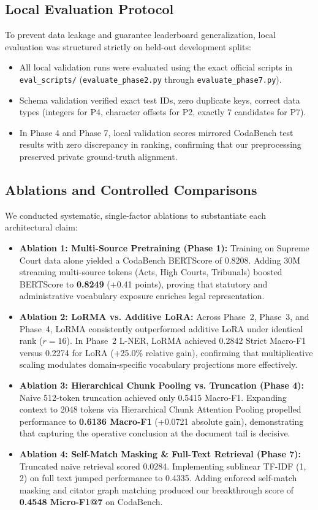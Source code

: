 \documentclass[11pt, oneside]{article}
\begin{document}
\subsection{Local Evaluation Protocol}
To prevent data leakage and guarantee leaderboard generalization, local evaluation was structured strictly on held-out development splits:
\begin{itemize}
    \item All local validation runs were evaluated using the exact official scripts in \texttt{eval\_scripts/} (\texttt{evaluate\_phase2.py} through \texttt{evaluate\_phase7.py}).
    \item Schema validation verified exact test IDs, zero duplicate keys, correct data types (integers for P4, character offsets for P2, exactly 7 candidates for P7).
    \item In Phase 4 and Phase 7, local validation scores mirrored CodaBench test results with zero discrepancy in ranking, confirming that our preprocessing preserved private ground-truth alignment.
\end{itemize}

\subsection{Ablations and Controlled Comparisons}
We conducted systematic, single-factor ablations to substantiate each architectural claim:
\begin{itemize}
    \item \textbf{Ablation 1: Multi-Source Pretraining (Phase 1):} Training on Supreme Court data alone yielded a CodaBench BERTScore of 0.8208. Adding 30M streaming multi-source tokens (Acts, High Courts, Tribunals) boosted BERTScore to \textbf{0.8249} (+0.41 points), proving that statutory and administrative vocabulary exposure enriches legal representation.
    \item \textbf{Ablation 2: LoRMA vs. Additive LoRA:} Across Phase~2, Phase~3, and Phase~4, LoRMA consistently outperformed additive LoRA under identical rank ($r=16$). In Phase~2 L-NER, LoRMA achieved 0.2842 Strict Macro-F1 versus 0.2274 for LoRA (+25.0\% relative gain), confirming that multiplicative scaling modulates domain-specific vocabulary projections more effectively.
    \item \textbf{Ablation 3: Hierarchical Chunk Pooling vs. Truncation (Phase 4):} Naive 512-token truncation achieved only 0.5415 Macro-F1. Expanding context to 2048 tokens via Hierarchical Chunk Attention Pooling propelled performance to \textbf{0.6136 Macro-F1} (+0.0721 absolute gain), demonstrating that capturing the operative conclusion at the document tail is decisive.
    \item \textbf{Ablation 4: Self-Match Masking \& Full-Text Retrieval (Phase 7):} Truncated naive retrieval scored 0.0284. Implementing sublinear TF-IDF (1, 2) on full text jumped performance to 0.4335. Adding enforced self-match masking and citator graph matching produced our breakthrough score of \textbf{0.4548 Micro-F1@7} on CodaBench.
\end{itemize}
\end{document}

